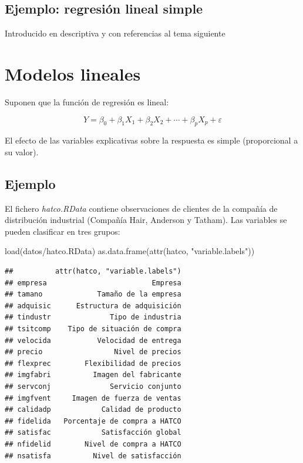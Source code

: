 \documentclass[
]{book}
\newenvironment{Shaded}{\begin{snugshade}}{\end{snugshade}}
\newcommand{\FunctionTok}[1]{\textcolor[rgb]{0.00,0.00,0.00}{#1}}
\newcommand{\NormalTok}[1]{#1}
\newcommand{\StringTok}[1]{\textcolor[rgb]{0.31,0.60,0.02}{#1}}
\theoremstyle{break}
\begin{document}
\hypertarget{ejemplo-regresiuxf3n-lineal-simple}{%
\section{Ejemplo: regresión lineal simple}\label{ejemplo-regresiuxf3n-lineal-simple}}

Introducido en descriptiva y con referencias al tema siguiente

\hypertarget{modelos-lineales}{%
\chapter{Modelos lineales}\label{modelos-lineales}}

Suponen que la función de regresión es lineal:

\[Y=\beta_{0}+\beta_{1}X_{1}+\beta_{2}X_{2}+\cdots+\beta_{p}X_{p}+\varepsilon\]

El efecto de las variables explicativas sobre la respuesta es simple (proporcional a su valor).

\hypertarget{ejemplo}{%
\section{Ejemplo}\label{ejemplo}}

El fichero \emph{hatco.RData} contiene observaciones de clientes de la compañía de
distribución industrial (Compañía Hair, Anderson y Tatham).
Las variables se pueden clasificar en tres grupos:

\begin{Shaded}
\begin{Highlighting}[]
\FunctionTok{load}\NormalTok{(}\StringTok{\textquotesingle{}datos/hatco.RData\textquotesingle{}}\NormalTok{)}
\FunctionTok{as.data.frame}\NormalTok{(}\FunctionTok{attr}\NormalTok{(hatco, }\StringTok{"variable.labels"}\NormalTok{))}
\end{Highlighting}
\end{Shaded}

\begin{verbatim}
##          attr(hatco, "variable.labels")
## empresa                         Empresa
## tamano             Tamaño de la empresa
## adquisic      Estructura de adquisición
## tindustr              Tipo de industria
## tsitcomp    Tipo de situación de compra
## velocida           Velocidad de entrega
## precio                 Nivel de precios
## flexprec        Flexibilidad de precios
## imgfabri          Imagen del fabricante
## servconj              Servicio conjunto
## imgfvent     Imagen de fuerza de ventas
## calidadp            Calidad de producto
## fidelida   Porcentaje de compra a HATCO
## satisfac            Satisfacción global
## nfidelid        Nivel de compra a HATCO
## nsatisfa          Nivel de satisfacción
\end{verbatim}
\end{document}
